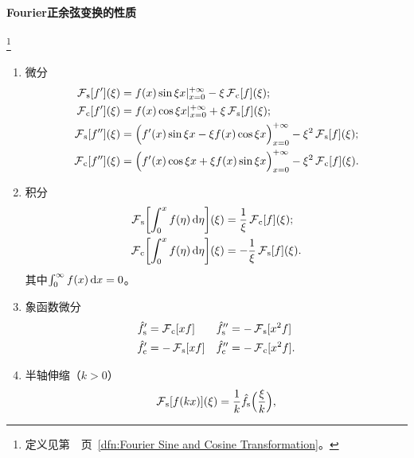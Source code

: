 \paragraph{Fourier正余弦变换的性质}\label{The Property of Sine and Cosine Transformation}\footnote{定义见第~\pageref{dfn:Fourier Sine and Cosine Transformation}~页~\ref{dfn:Fourier Sine and Cosine Transformation}。}
\begin{enumerate}
	\item 微分
	\begin{subequations}
		\label{eq:mmp-half-line-derivatives}
		\begin{align}
			\operatorname{\mathcal{F}}_\mathrm s[f'](\xi) &= f(x)\sin\xi x|_{x=0}^{+\infty} - \xi\operatorname{\mathcal{F}}_\mathrm c[f](\xi);\\
			\operatorname{\mathcal{F}}_\mathrm c[f'](\xi) &= f(x)\cos\xi x|_{x=0}^{+\infty} + \xi\operatorname{\mathcal{F}}_\mathrm s[f](\xi);\\
			\operatorname{\mathcal{F}}_\mathrm s[f''](\xi) &= \Bigl(f'(x)\sin\xi x - \xi f(x)\cos\xi x\Bigr)_{x=0}^{+\infty} - \xi^2\operatorname{\mathcal{F}}_\mathrm s[f](\xi);\\
			\operatorname{\mathcal{F}}_\mathrm c[f''](\xi) &= \Bigl(f'(x)\cos\xi x + \xi f(x)\sin\xi x\Bigr)_{x=0}^{+\infty} - \xi^2\operatorname{\mathcal{F}}_\mathrm c[f](\xi).
		\end{align}
	\end{subequations}
	\item 积分
	\begin{subequations}
		\label{eq:mmp-half-line-primitives}
		\begin{align}
			\operatorname{\mathcal{F}}_\mathrm s\biggl[\int_0^xf(\eta)\mathop{}\!\mathrm{d}\eta\biggr](\xi) &= \frac1\xi\operatorname{\mathcal{F}}_\mathrm c[f](\xi);\\
			\operatorname{\mathcal{F}}_\mathrm c\biggl[\int_0^xf(\eta)\mathop{}\!\mathrm{d}\eta\biggr](\xi) &= -\frac1\xi\operatorname{\mathcal{F}}_\mathrm s[f](\xi).
		\end{align}
	\end{subequations}
	其中$\textstyle \int_0^\infty f(x)\mathop{}\!\mathrm{d} x = 0$。
	\item 象函数微分
	\begin{subequations}
		\label{eq:mmp-half-line-frequency-derivatives}
		\begin{align}
			\hat f_\mathrm s' &= \operatorname{\mathcal{F}}_\mathrm c[xf]&\hat f_\mathrm s'' &= -\operatorname{\mathcal{F}}_\mathrm s[x^2f]\\
			\hat f_\mathrm c' &= -\operatorname{\mathcal{F}}_\mathrm s[xf]&\hat f_\mathrm c'' &= -\operatorname{\mathcal{F}}_\mathrm c[x^2f].
		\end{align}
	\end{subequations}
	\item 半轴伸缩（$k > 0$）\begin{subequations}
		\label{eq:mmp-half-line-dilation}
		\begin{align}
				\FT_\sine[f(kx)](\xi) = \frac1k\hat f_\sine\Bigp{\frac\xi{k}},\\

\end{align}
\end{subequations}
\end{enumerate}
